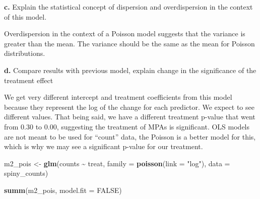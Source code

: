 \documentclass[
]{article}
\newenvironment{Shaded}{\begin{snugshade}}{\end{snugshade}}
\newcommand{\AttributeTok}[1]{\textcolor[rgb]{0.13,0.29,0.53}{#1}}
\newcommand{\ConstantTok}[1]{\textcolor[rgb]{0.56,0.35,0.01}{#1}}
\newcommand{\FunctionTok}[1]{\textcolor[rgb]{0.13,0.29,0.53}{\textbf{#1}}}
\newcommand{\NormalTok}[1]{#1}
\newcommand{\OtherTok}[1]{\textcolor[rgb]{0.56,0.35,0.01}{#1}}
\newcommand{\SpecialCharTok}[1]{\textcolor[rgb]{0.81,0.36,0.00}{\textbf{#1}}}
\newcommand{\StringTok}[1]{\textcolor[rgb]{0.31,0.60,0.02}{#1}}
\begin{document}
\textbf{c.} Explain the statistical concept of dispersion and
overdispersion in the context of this model.

Overdispersion in the context of a Poisson model suggests that the
variance is greater than the mean. The variance should be the same as
the mean for Poisson distributions.

\textbf{d.} Compare results with previous model, explain change in the
significance of the treatment effect

We get very different intercept and treatment coefficients from this
model because they represent the log of the change for each predictor.
We expect to see different values. That being said, we have a different
treatment p-value that went from 0.30 to 0.00, suggesting the treatment
of MPAs is significant. OLS models are not meant to be used for
``count'' data, the Poisson is a better model for this, which is why we
may see a significant p-value for our treatment.

\begin{Shaded}
\begin{Highlighting}[]
\NormalTok{m2\_pois }\OtherTok{\textless{}{-}} \FunctionTok{glm}\NormalTok{(counts }\SpecialCharTok{\textasciitilde{}}\NormalTok{ treat,}
               \AttributeTok{family =} \FunctionTok{poisson}\NormalTok{(}\AttributeTok{link =} \StringTok{"log"}\NormalTok{),}
               \AttributeTok{data =}\NormalTok{ spiny\_counts)}

\FunctionTok{summ}\NormalTok{(m2\_pois, }\AttributeTok{model.fit =} \ConstantTok{FALSE}\NormalTok{)}
\end{Highlighting}
\end{Shaded}
\end{document}
